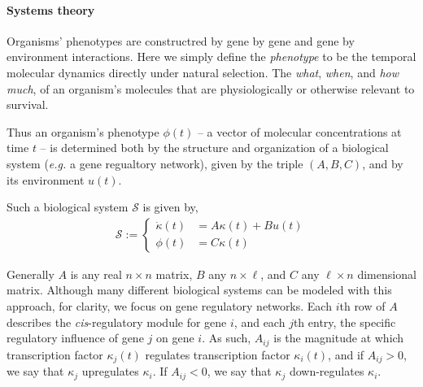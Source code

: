 \documentclass{article}
\newcommand{\1}{\mathbbm{1}}
\begin{document}
%
\paragraph{Systems theory}
Organisms' phenotypes are constructred by gene by gene and gene by environment interactions. Here we simply define the \emph{phenotype} to be the temporal molecular dynamics directly under natural selection. The \emph{what}, \emph{when}, and \emph{how much}, of an organism's molecules that are physiologically or otherwise relevant to survival.

Thus an organism's phenotype $\phi(t)$ -- a vector of molecular concentrations at time $t$ -- is determined both by the structure and organization of a biological system (\emph{e.g.} a gene regualtory network), given by the triple $(A,B,C)$,
and by its environment $u(t)$.

Such a biological system $\mathcal{S}$ is given by,
  \begin{align}
    \mathcal{S} := \left\{ \begin{array}{ll} \dot{\kappa}(t) &= A \kappa(t) + B u(t) \\ \phi(t) &= C \kappa(t) \end{array} \right.
  \end{align}

Generally $A$ is any real $n \times n$ matrix, $B$ any $n \times \ell$, and $C$ any $\ell \times n$ dimensional matrix. Although many different biological systems can be modeled with this approach, for clarity, we focus on gene regulatory networks.
%
Each $i$th row of $A$ describes the \emph{cis}-regulatory module for gene $i$, and each $j$th entry, the specific regulatory influence of gene $j$ on gene $i$. 
%
As such, $A_{ij}$ is the magnitude at which transcription factor $\kappa_j(t)$ regulates transcription factor $\kappa_i(t)$, and if $A_{ij} > 0$, we say that $\kappa_j$ upregulates $\kappa_i$. If $A_{ij} < 0$, we say that $\kappa_j$ down-regulates $\kappa_i$. 
\end{document}
